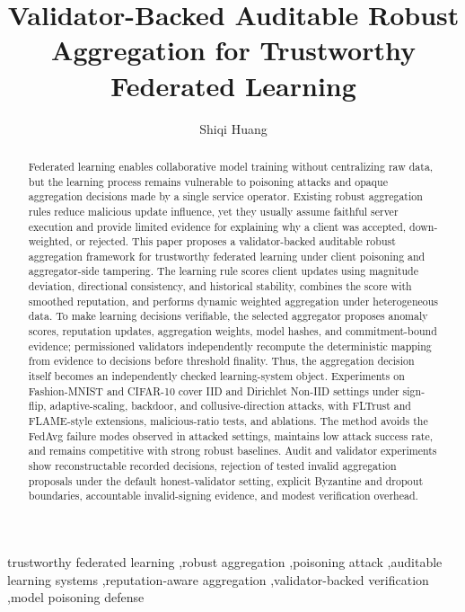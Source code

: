 \documentclass[preprint,12pt]{elsarticle}
\begin{document}
\begin{frontmatter}

\title{Validator-Backed Auditable Robust Aggregation for Trustworthy Federated Learning}

\author[aff1]{Shiqi Huang}
\address[aff1]{Faculty of Computational Mathematics and Cybernetics, Lomonosov Moscow State University, Moscow, Russia}

\begin{abstract}
Federated learning enables collaborative model training without centralizing raw data, but the learning process remains vulnerable to poisoning attacks and opaque aggregation decisions made by a single service operator. Existing robust aggregation rules reduce malicious update influence, yet they usually assume faithful server execution and provide limited evidence for explaining why a client was accepted, down-weighted, or rejected. This paper proposes a validator-backed auditable robust aggregation framework for trustworthy federated learning under client poisoning and aggregator-side tampering. The learning rule scores client updates using magnitude deviation, directional consistency, and historical stability, combines the score with smoothed reputation, and performs dynamic weighted aggregation under heterogeneous data. To make learning decisions verifiable, the selected aggregator proposes anomaly scores, reputation updates, aggregation weights, model hashes, and commitment-bound evidence; permissioned validators independently recompute the deterministic mapping from evidence to decisions before threshold finality. Thus, the aggregation decision itself becomes an independently checked learning-system object. Experiments on Fashion-MNIST and CIFAR-10 cover IID and Dirichlet Non-IID settings under sign-flip, adaptive-scaling, backdoor, and collusive-direction attacks, with FLTrust and FLAME-style extensions, malicious-ratio tests, and ablations. The method avoids the FedAvg failure modes observed in attacked settings, maintains low attack success rate, and remains competitive with strong robust baselines. Audit and validator experiments show reconstructable recorded decisions, rejection of tested invalid aggregation proposals under the default honest-validator setting, explicit Byzantine and dropout boundaries, accountable invalid-signing evidence, and modest verification overhead.
\end{abstract}

\begin{keyword}
trustworthy federated learning \sep robust aggregation \sep poisoning attack \sep auditable learning systems \sep reputation-aware aggregation \sep validator-backed verification \sep model poisoning defense
\end{keyword}

\end{frontmatter}
\end{document}
